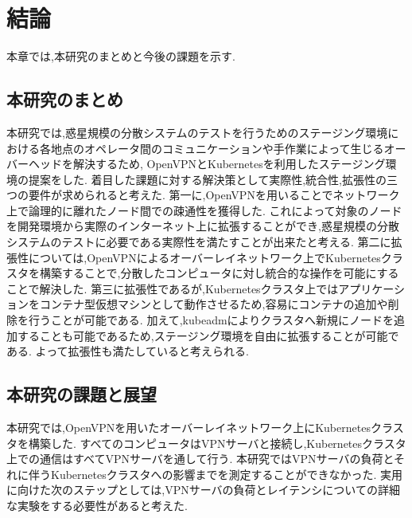 \chapter{結論}
\label{conclusion}

本章では,本研究のまとめと今後の課題を示す.

\section{本研究のまとめ}
\label{conclusion:conclusion}

本研究では,惑星規模の分散システムのテストを行うためのステージング環境における各地点のオペレータ間のコミュニケーションや手作業によって生じるオーバーヘッドを解決するため,
OpenVPNとKubernetesを利用したステージング環境の提案をした.
着目した課題に対する解決策として実際性,統合性,拡張性の三つの要件が求められると考えた.
第一に,OpenVPNを用いることでネットワーク上で論理的に離れたノード間での疎通性を獲得した.
これによって対象のノードを開発環境から実際のインターネット上に拡張することができ,惑星規模の分散システムのテストに必要である実際性を満たすことが出来たと考える.
第二に拡張性については,OpenVPNによるオーバーレイネットワーク上でKubernetesクラスタを構築することで,分散したコンピュータに対し統合的な操作を可能にすることで解決した.
第三に拡張性であるが,Kubernetesクラスタ上ではアプリケーションをコンテナ型仮想マシンとして動作させるため,容易にコンテナの追加や削除を行うことが可能である.
加えて,kubeadmによりクラスタへ新規にノードを追加することも可能であるため,ステージング環境を自由に拡張することが可能である.
よって拡張性も満たしていると考えられる.

\section{本研究の課題と展望}
\label{conclusion:issue}

本研究では,OpenVPNを用いたオーバーレイネットワーク上にKubernetesクラスタを構築した.
すべてのコンピュータはVPNサーバと接続し,Kubernetesクラスタ上での通信はすべてVPNサーバを通して行う.
本研究ではVPNサーバの負荷とそれに伴うKubernetesクラスタへの影響までを測定することができなかった.
実用に向けた次のステップとしては,VPNサーバの負荷とレイテンシについての詳細な実験をする必要性があると考えた.

